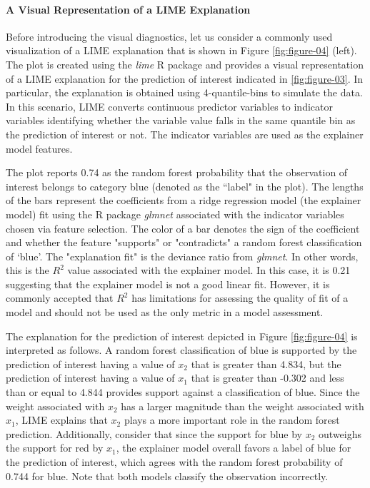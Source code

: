 \documentclass[AMS,STIX2COL]{WileyNJD-v2}\usepackage[]{graphicx}\usepackage[]{color}
\begin{document}
\paragraph{A Visual Representation of a LIME Explanation}

Before introducing the visual diagnostics, let us consider a commonly used visualization of a LIME explanation that is shown in Figure \ref{fig:figure-04} (left). The plot is created using the \emph{lime} R package and provides a visual representation of a LIME explanation for the prediction of interest indicated in \autoref{fig:figure-03}. In particular, the explanation is obtained using 4-quantile-bins to simulate the data. In this scenario, LIME converts continuous predictor variables to indicator variables identifying whether the variable value falls in the same quantile bin as the prediction of interest or not. The indicator variables are used as the explainer model features.  

The plot reports 0.74 as  the random forest  probability  that the observation of interest belongs to category blue (denoted as the ``label" in the plot). The lengths of the bars represent the  coefficients from a ridge regression model (the explainer model) fit using the R package \emph{glmnet} \citep{simon:2011} associated with the indicator variables chosen via feature selection. The color of a  bar denotes the sign of the coefficient and whether the feature "supports" or "contradicts" a random forest classification of `blue'. The "explanation fit" is the deviance ratio from  \emph{glmnet}. In other words, this is the $R^2$ value associated with the explainer model. In this case, it is 0.21 suggesting that the explainer model is not a good linear fit. However, it is commonly accepted that $R^2$ has limitations for assessing the quality of fit of a model \citep{sapra:2014} and  should not be used as the only metric in a model assessment.

The explanation for the prediction of interest depicted in Figure \ref{fig:figure-04} is interpreted as follows. A random forest classification of blue is supported by the prediction of interest having a value of $x_2$ that is greater than 4.834, but the prediction of interest having a value of $x_1$ that is greater than -0.302 and less than or equal to 4.844 provides support against a classification of blue. Since the weight associated with $x_2$ has a larger magnitude than the weight associated with $x_1$, LIME explains that $x_2$ plays a more important role in the random forest prediction. Additionally, consider that since the support for blue by $x_2$ outweighs the support for red by $x_1$, the explainer model overall favors a label of blue for the prediction of interest, which agrees with the random forest probability of 0.744 for blue. Note that both models classify the observation incorrectly.
\end{document}

